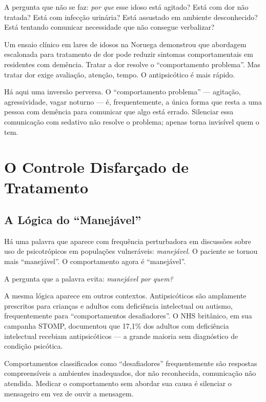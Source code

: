 A pergunta que não se faz: \textit{por que} esse idoso está agitado? Está com dor não tratada? Está com infecção urinária? Está assustado em ambiente desconhecido? Está tentando comunicar necessidade que não consegue verbalizar?

Um ensaio clínico em lares de idosos na Noruega demonstrou que abordagem escalonada para tratamento de dor pode reduzir sintomas comportamentais em residentes com demência. Tratar a dor resolve o \enquote{comportamento problema}. Mas tratar dor exige avaliação, atenção, tempo. O antipsicótico é mais rápido.

Há aqui uma inversão perversa. O \enquote{comportamento problema} --- agitação, agressividade, vagar noturno --- é, frequentemente, a única forma que resta a uma pessoa com demência para comunicar que algo está errado. Silenciar essa comunicação com sedativo não resolve o problema; apenas torna invisível quem o tem.

\section{O Controle Disfarçado de Tratamento}
\label{sec:controle-tratamento}

\subsection{A Lógica do \enquote{Manejável}}

Há uma palavra que aparece com frequência perturbadora em discussões sobre uso de psicotrópicos em populações vulneráveis: \textit{manejável}. O paciente se tornou mais \enquote{manejável}. O comportamento agora é \enquote{manejável}.

A pergunta que a palavra evita: \textit{manejável por quem?}

A mesma lógica aparece em outros contextos. Antipsicóticos são amplamente prescritos para crianças e adultos com deficiência intelectual ou autismo, frequentemente para \enquote{comportamentos desafiadores}. O NHS britânico, em sua campanha STOMP, documentou que 17,1\% dos adultos com deficiência intelectual recebiam antipsicóticos --- a grande maioria sem diagnóstico de condição psicótica.

Comportamentos classificados como \enquote{desafiadores} frequentemente são respostas compreensíveis a ambientes inadequados, dor não reconhecida, comunicação não atendida. Medicar o comportamento sem abordar sua causa é silenciar o mensageiro em vez de ouvir a mensagem.

